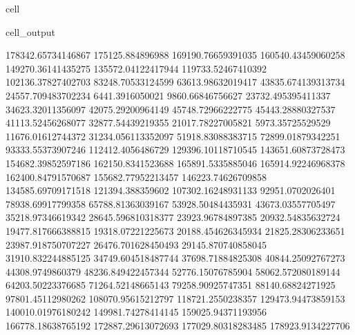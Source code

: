 \documentclass[letterpaper,10pt,english]{jupyterBook}
\begin{document}
\begin{sphinxuseclass}{cell}
\begin{sphinxVerbatimOutput}
\begin{sphinxuseclass}{cell_output}
\begin{sphinxVerbatim}[commandchars=\\\{\}]
178342.65734146867  175125.884896988  169190.76659391035  160540.43459060258  149270.36141435275  135572.04122417944  119733.52467410392  102136.37827402703  83248.70533124599  63613.98632019417  43835.674139313734  24557.709483702234  6441.3916050021  \PYGZhy{}9860.66846756627  \PYGZhy{}23732.495395411337  \PYGZhy{}34623.32011356097  \PYGZhy{}42075.29200964149  \PYGZhy{}45748.72966222775  \PYGZhy{}45443.28880327537  \PYGZhy{}41113.52456268077  \PYGZhy{}32877.54439219355  \PYGZhy{}21017.78227005821  \PYGZhy{}5973.35725529529  11676.01612744372  31234.056113352097  51918.83088383715  72899.01879342251  93333.55373907246  112412.4056486729  129396.10118710545  143651.60873728473  154682.39852597186  162150.8341523688  165891.5335885046  165914.92246968378  162400.84791570687  155682.77952213457  146223.74626709858  134585.69709171518  121394.388359602  107302.16248931133  92951.0702026401  78938.69917799358  65788.81363039167  53928.50484435931  43673.03557705497  35218.97346619342  28645.596810318377  23923.96784897385  20932.54835632724  19477.817666388815  19318.07221225673  20188.454626345934  21825.28306233651  23987.918750707227  26476.701628450493  29145.870740858045  31910.832244885125  34749.604518487744  37698.71884825308  40844.25092767273  44308.9749860379  48236.849422457344  52776.15076785904  58062.572080189144  64203.50223376685  71264.52148665143  79258.90925747351  88140.68824271925  97801.45112980262  108070.95615212797  118721.2550238357  129473.94473859153  140010.01976180242  149981.74278414145  159025.94371193956  166778.18638765192  172887.29613072693  177029.80318283485  178923.9134227706  

\end{sphinxVerbatim}
\end{sphinxuseclass}
\end{sphinxVerbatimOutput}
\end{sphinxuseclass}
\end{document}
